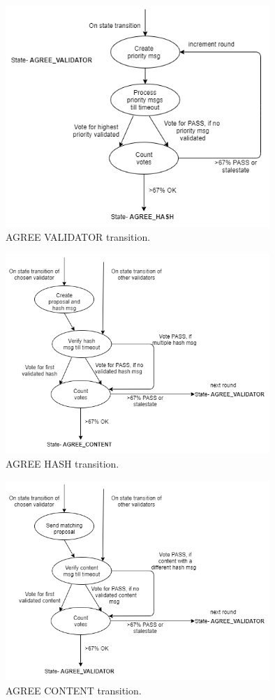 \begin{figure}
    \centering
    \includegraphics[width=100mm,scale=0.25]{figures/drawio/priority.png}
    \caption{AGREE VALIDATOR transition.}
    \label{fig:VALIDATOR}
\end{figure}


\begin{figure}
    \centering
    \includegraphics[width=100mm,scale=0.25]{figures/drawio/hash.png}
    \caption{AGREE HASH transition.}
    \label{fig:HASH}
\end{figure}


\begin{figure}
    \centering
    \includegraphics[width=100mm,scale=0.25]{figures/drawio/contents.png}
    \caption{AGREE CONTENT transition.}
    \label{fig:CONTENT}
\end{figure}

